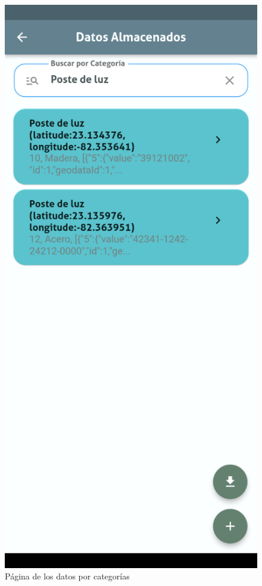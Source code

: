 \documentclass{article}
\begin{document}
\begin{figure}[H]
\begin{minipage}[b]{0.3\textwidth}
    \caption{Página de los datos por categorías}
    \label{fig:geodataexporter1}
  \end{minipage}
  \hspace{0.02\textwidth}
  \begin{minipage}[b]{0.3\textwidth}
    \centering
    \includegraphics[width=\textwidth]{images/functionality_test/geodata_exporter11.png}

\end{minipage}
\end{figure}
\end{document}

